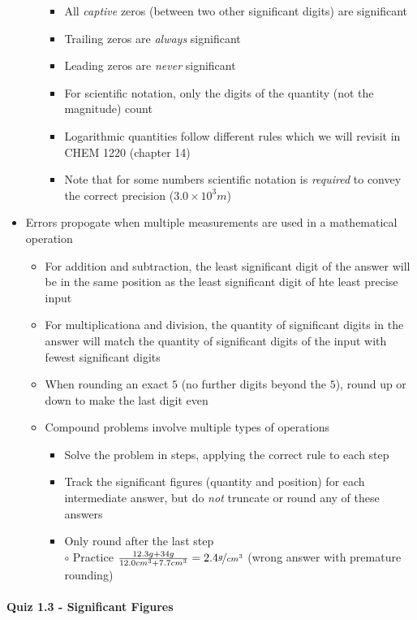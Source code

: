 \documentclass[12pt, openany, letterpaper]{memoir}
\begin{document}
\begin{itemize}
\begin{itemize}
\begin{itemize}
      \item All \emph{captive} zeros (between two other significant digits) are significant
      \item Trailing zeros are \emph{always} significant
      \item Leading zeros are \emph{never} significant
      \item For scientific notation, only the digits of the quantity (not the magnitude) count
      \item Logarithmic quantities follow different rules which we will revisit in CHEM 1220 (chapter 14)
      \item Note that for some numbers scientific notation is \emph{required} to convey the correct precision ($3.0\times10^3m$)
    \end{itemize}
  \end{itemize}
  \item Errors propogate when multiple measurements are used in a mathematical operation
  \begin{itemize}
    \item For addition and subtraction, the least significant digit of the answer will be in the same position as the least significant digit of hte least precise input
    \item For multiplicationa and division, the quantity of significant digits in the answer will match the quantity of significant digits of the input with fewest significant digits
    \item When rounding an exact $5$ (no further digits beyond the $5$), round up or down to make the last digit even
    \item Compound problems involve multiple types of operations
    \begin{itemize}
      \item Solve the problem in steps, applying the correct rule to each step
      \item Track the significant figures (quantity and position) for each intermediate answer, but do \emph{not} truncate or round any of these answers
      \item Only round after the last step
        \\ $\circ$ Practice $\frac{12.3g+34g}{12.0cm^3+7.7cm^3}=2.4\nicefrac{g}{cm^3}$ (wrong answer with premature rounding)
    \end{itemize}
  \end{itemize}
\end{itemize}
\paragraph*{Quiz 1.3 - Significant Figures}
\end{document}
